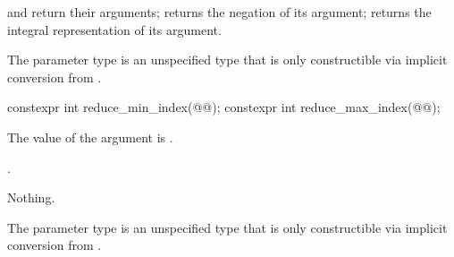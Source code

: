 \begin{itemdescr}
  \pnum\returns
   and  return their arguments;  returns the negation of its argument;  returns the integral representation of its argument.

  \pnum\remarks
  The parameter type  is an unspecified type that is only constructible via implicit conversion from .
\end{itemdescr}

\begin{itemdecl}
constexpr int reduce_min_index(@@);
constexpr int reduce_max_index(@@);
\end{itemdecl}

\begin{itemdescr}
  \pnum\requires
  The value of the argument is .

  \pnum\returns
  .

  \pnum\throws Nothing.

  \pnum\remarks
  The parameter type  is an unspecified type that is only constructible via implicit conversion from .
\end{itemdescr}


